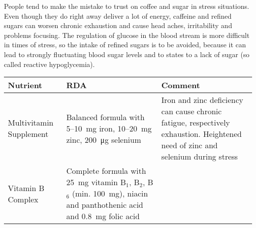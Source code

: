 \documentclass[../main.tex]{subfiles}
\begin{document}
  People tend to make the mistake to trust on coffee and sugar in stress situations.
  Even though they do right away deliver a lot of energy, caffeine and refined sugars
  can worsen chronic exhaustion
  and cause head aches, irritability
  and problems focusing.
  The regulation of glucose in the blood stream is more difficult in times of stress,
  so the intake of refined sugars is to be avoided, because it can lead to strongly fluctuating blood sugar levels
  and to states to a lack of sugar (so called reactive hypoglycemia).

  \begin{table}[htb!]
    \centering
    \begin{tabular}{p{2.2cm}p{4cm}p{5.2cm}}
      \textbf{Nutrient} &\textbf{RDA} & \textbf{Comment} \\
      \hline
      Multivitamin Supplement & Balanced formula with 5--\SI{10}{\milli\gram} iron\index{mineral!iron}, 10--\SI{20}{\milli\gram} zinc\index{mineral!zinc},
                                \SI{200}{\micro\gram} selenium\index{mineral!selenium}
                                      & Iron and zinc deficiency can cause chronic fatigue, respectively exhaustion. Heightened need of zinc and selenium during stress \\                                                                        Vitamin B Complex & Complete formula with \SI{25}{\milli\gram} vitamin B$_1$\index{vitamin!B1},  B$_2$\index{vitamin!B2},  B$_6$\index{vitamin!B6}
                                                                                                                                                                                                                                                                      (min. \SI{100}{\milli\gram}),
                                                                                                                                                                                                                                                                      niacin\index{micro nutrient!niacin} and panthothenic acid\index{micro nutrient!panthothenic acid}
                                                                                                                                                                                                                                                                      and \SI{0.8}{\milli\gram} folic acid\index{micro nutrient!folic acid}

\end{tabular}
\end{table}
\end{document}
